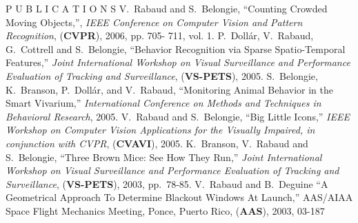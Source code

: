 \begin{rubric}{P U B L I C A T I O N S}
\entry*[2006]
V.~Rabaud and S.~Belongie, ``Counting Crowded Moving Objects,'', {\em IEEE Conference on Computer Vision and Pattern Recognition}, (\textbf{CVPR}), 2006, pp. 705- 711, vol. 1.
\entry*[2005]
P.~Doll\'ar, V.~Rabaud, G.~Cottrell and S.~Belongie, ``Behavior Recognition via Sparse Spatio-Temporal Features,'' {\em Joint International Workshop on Visual Surveillance and Performance Evaluation of Tracking and Surveillance}, (\textbf{VS-PETS}), 2005. 
\entry*[2005]
S.~Belongie, K.~Branson, P.~Doll\'ar, and V.~Rabaud, ``Monitoring Animal Behavior in the Smart Vivarium,'' {\em International Conference on Methods and Techniques in Behavioral Research}, 2005.
\entry*[2005]
V.~Rabaud and S.~Belongie, ``Big Little Icons,'' {\em IEEE Workshop on Computer Vision Applications for the Visually Impaired, in conjunction with CVPR}, (\textbf{CVAVI}), 2005.
\entry*[2003]
K.\ Branson, V.\ Rabaud and S.\ Belongie, ``Three Brown Mice: See How They Run,''
{\em Joint International Workshop on Visual Surveillance and Performance Evaluation of Tracking and Surveillance}, (\textbf{VS-PETS}), 2003, pp.\ 78-85. 
\entry*[2003]
V.\ Rabaud and B.\ Deguine ``A Geometrical Approach To Determine Blackout Windows At Launch,''
AAS/AIAA Space Flight Mechanics Meeting, Ponce, Puerto Rico, (\textbf{AAS}), 2003, 03-187 
\end{rubric}




